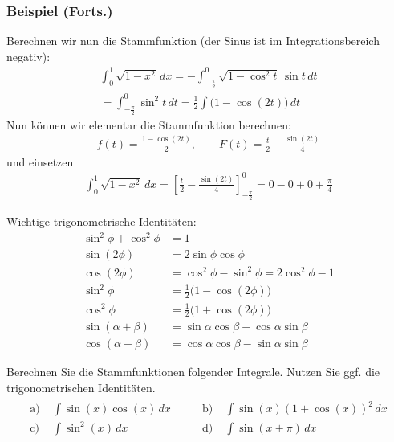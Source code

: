 \begin{frame}
    \frametitle<presentation>{Beispiel (Forts.)}
    Berechnen wir nun die Stammfunktion (der Sinus ist im Integrationsbereich negativ):
    \begin{multline*}
        \int_0^1 \sqrt{1-x^2}\,dx = - \int_{-\frac\pi2}^0 \sqrt{1-\cos^2 t}\,\sin t\,dt
        \\
        = \int_{-\frac\pi2}^0 \sin^2 t\,dt
        = \frac{1}2\int \bigl(1-\cos (2t)\bigr)\,dt
    \end{multline*}
    Nun können wir elementar die Stammfunktion berechnen: 
    \begin{gather*}
        f(t) = \frac{1-\cos(2t)}{2},\qquad F(t)
        = \frac t2-\frac{\sin(2t)}4
    \end{gather*}
    \pause
    und einsetzen
    \begin{gather*}
        \int_0^1 \sqrt{1-x^2}\,dx = \left[
        \frac t2-\frac{\sin(2t)}4\right]_{-\frac\pi2}^0
        = 0-0+0+\frac\pi4
    \end{gather*}
\end{frame}

\begin{Wdh}
Wichtige trigonometrische Identitäten:
\begin{align*}
\sin^2 \phi + \cos^2 \phi &= 1 \\[6pt]
\sin(2\phi) &= 2 \sin \phi \cos \phi \\[6pt]
\cos(2\phi) &= \cos^2 \phi - \sin^2 \phi = 2\cos^2 \phi - 1 \\[6pt]
\sin^2 \phi &= \tfrac{1}{2}\bigl(1 - \cos(2\phi)\bigr) \\[6pt]
\cos^2 \phi &= \tfrac{1}{2}\bigl(1 + \cos(2\phi)\bigr) \\[6pt]
\sin(\alpha + \beta) &= \sin \alpha \cos \beta + \cos \alpha \sin \beta \\[6pt]
\cos(\alpha + \beta) &= \cos \alpha \cos \beta - \sin \alpha \sin \beta
\end{align*}
\end{Wdh}

\begin{Aufgabe}
    Berechnen Sie die Stammfunktionen folgender Integrale. Nutzen Sie ggf. die trigonometrischen Identitäten.
    \begin{align*}
    \begin{alignedat}{2}
        \text{a)}\;& \int \sin(x)\cos(x)\,dx \qquad &
        \text{b)}\;& \int \sin(x)(1+\cos(x))^2 \, dx \\
        \text{c)}\;& \int \sin^2(x)\,dx \qquad &
        \text{d)}\;& \int \sin(x+\pi)\,dx
    \end{alignedat}
    \end{align*}
\end{Aufgabe}

